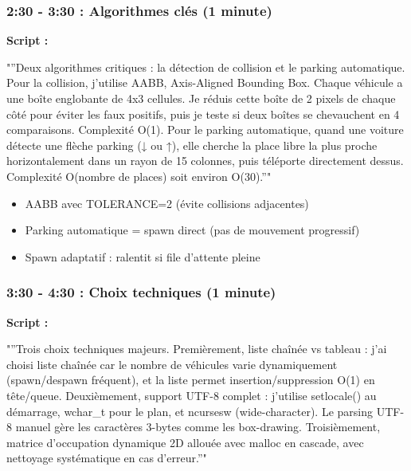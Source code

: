 \documentclass[12pt,a4paper]{article}
\newcommand{\sectiontime}[1]{%
    \textcolor{warningorange}{\textbf{#1}}
}
\begin{document}
\subsubsection{\sectiontime{2:30 - 3:30} : Algorithmes clés (1 minute)}

\begin{script_pitch}
\textbf{Script :}

"''Deux algorithmes critiques : la détection de collision et le parking automatique. Pour la collision, j'utilise AABB, Axis-Aligned Bounding Box. Chaque véhicule a une boîte englobante de 4x3 cellules. Je réduis cette boîte de 2 pixels de chaque côté pour éviter les faux positifs, puis je teste si deux boîtes se chevauchent en 4 comparaisons. Complexité O(1). Pour le parking automatique, quand une voiture détecte une flèche parking (↓ ou ↑), elle cherche la place libre la plus proche horizontalement dans un rayon de 15 colonnes, puis téléporte directement dessus. Complexité O(nombre de places) soit environ O(30).''"
\end{script_pitch}

\begin{points_cles}
\begin{itemize}[leftmargin=0.5cm]
    \item AABB avec TOLERANCE=2 (évite collisions adjacentes)
    \item Parking automatique = spawn direct (pas de mouvement progressif)
    \item Spawn adaptatif : ralentit si file d'attente pleine
\end{itemize}
\end{points_cles}

\subsubsection{\sectiontime{3:30 - 4:30} : Choix techniques (1 minute)}

\begin{script_pitch}
\textbf{Script :}

"''Trois choix techniques majeurs. Premièrement, liste chaînée vs tableau : j'ai choisi liste chaînée car le nombre de véhicules varie dynamiquement (spawn/despawn fréquent), et la liste permet insertion/suppression O(1) en tête/queue. Deuxièmement, support UTF-8 complet : j'utilise setlocale() au démarrage, wchar\_t pour le plan, et ncursesw (wide-character). Le parsing UTF-8 manuel gère les caractères 3-bytes comme les box-drawing. Troisièmement, matrice d'occupation dynamique 2D allouée avec malloc en cascade, avec nettoyage systématique en cas d'erreur.''"
\end{script_pitch}
\end{document}
